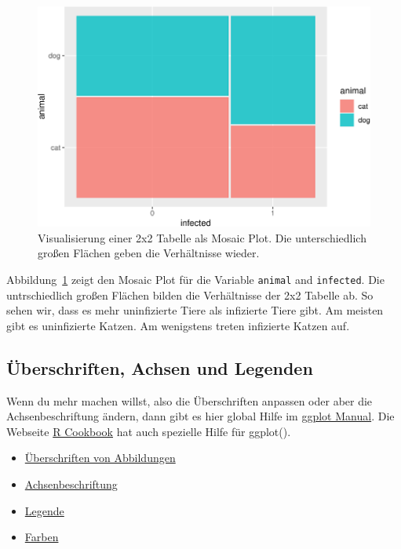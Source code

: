 \documentclass[
  letterpaper,
  DIV=11,
  oneside]{scrreport}
\providecommand{\tightlist}{%
  \setlength{\itemsep}{0pt}\setlength{\parskip}{0pt}}\usepackage{longtable,booktabs,array}
\begin{document}
\begin{figure}[H]

{\centering \includegraphics{./eda-ggplot_files/figure-pdf/fig-mosaic-flea-0-1.pdf}

}

\caption{\label{fig-mosaic-flea-0}Visualisierung einer 2x2 Tabelle als
Mosaic Plot. Die unterschiedlich großen Flächen geben die Verhältnisse
wieder.}

\end{figure}

Abbildung~\ref{fig-mosaic-flea-0} zeigt den Mosaic Plot für die Variable
\texttt{animal} and \texttt{infected}. Die untrschiedlich großen Flächen
bilden die Verhältnisse der 2x2 Tabelle ab. So sehen wir, dass es mehr
uninfizierte Tiere als infizierte Tiere gibt. Am meisten gibt es
uninfizierte Katzen. Am wenigstens treten infizierte Katzen auf.

\hypertarget{uxfcberschriften-achsen-und-legenden}{%
\subsection{Überschriften, Achsen und
Legenden}\label{uxfcberschriften-achsen-und-legenden}}

Wenn du mehr machen willst, also die Überschriften anpassen oder aber
die Achsenbeschriftung ändern, dann gibt es hier global Hilfe im
\href{https://ggplot2.tidyverse.org/reference/index.html}{ggplot
Manual}. Die Webseite
\href{https://ggplot2.tidyverse.org/reference/index.html}{R Cookbook}
hat auch spezielle Hilfe für ggplot().

\begin{itemize}
\tightlist
\item
  \href{http://www.cookbook-r.com/Graphs/Titles_(ggplot2)/}{Überschriften
  von Abbildungen}
\item
  \href{http://www.cookbook-r.com/Graphs/Axes_(ggplot2)/}{Achsenbeschriftung}
\item
  \href{http://www.cookbook-r.com/Graphs/Legends_(ggplot2)/}{Legende}
\item
  \href{http://www.cookbook-r.com/Graphs/Colors_(ggplot2)/}{Farben}
\end{itemize}
\end{document}
